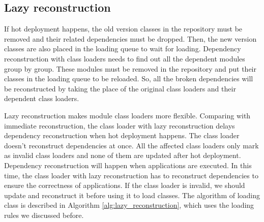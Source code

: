 \documentclass[conference]{IEEEtran}
\begin{document}
\subsection{Lazy reconstruction}

If hot deployment happens, the old version classes in the repository must be removed and their related dependencies must be dropped. 
Then, the new version classes are also placed in the loading queue to wait for loading. 
Dependency reconstruction with class loaders needs to find out all the dependent modules group by group. 
These modules must be removed in the repository and put their classes in the loading queue to be reloaded. 
So, all the broken dependencies will be reconstructed by taking the place of the original class loaders and their dependent class loaders. 

Lazy reconstruction makes module class loaders more flexible.
Comparing with immediate reconstruction, the class loader with lazy reconstruction delays dependency reconstruction when hot deployment happens.
The class loader doesn't reconstruct dependencies at once. 
All the affected class loaders only mark as invalid class loaders and none of them are updated after hot deployment.
Dependency reconstruction will happen when applications are executed.
In this time, the class loader with lazy reconstruction has to reconstruct dependencies to ensure the correctness of applications.
If the class loader is invalid, we should update and reconstruct it before using it to load classes. 
The algorithm of loading class is described in Algorithm \ref{alg:lazy_reconstruction}, which uses the loading rules we discussed before.

\end{document}
